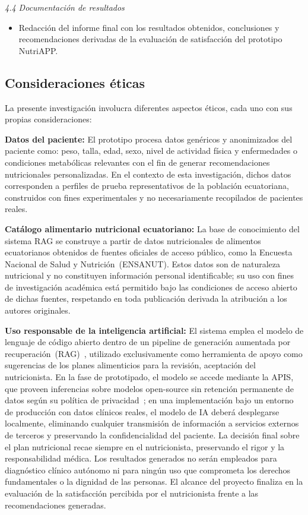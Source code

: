 \textit{4.4 Documentación de resultados}
\begin{itemize}
  \item Redacción del informe final con los resultados obtenidos, conclusiones y recomendaciones derivadas de la evaluación de satisfacción del prototipo NutriAPP.
\end{itemize}

\subsection{Consideraciones éticas}

La presente investigación involucra diferentes aspectos éticos, cada
uno con sus propias consideraciones:

\textbf{Datos del paciente:}
El prototipo procesa datos genéricos y anonimizados del paciente como: peso, talla, edad, sexo, nivel de actividad física y enfermedades o condiciones metabólicas
relevantes con el fin de generar recomendaciones nutricionales
personalizadas. En el contexto de esta investigación, dichos datos
corresponden a perfiles de prueba representativos de la población
ecuatoriana, construidos con fines experimentales y no necesariamente recopilados de pacientes reales. 

\textbf{Catálogo alimentario nutricional ecuatoriano:}
La base de conocimiento del sistema RAG se construye a partir de datos
nutricionales de alimentos ecuatorianos obtenidos de fuentes oficiales de
acceso público, como la Encuesta Nacional de Salud y Nutrición~(ENSANUT). Estos datos
son de naturaleza nutricional y no constituyen información personal
identificable; su uso con fines de investigación académica está permitido
bajo las condiciones de acceso abierto de dichas fuentes, respetando en toda
publicación derivada la atribución a los autores originales.

\textbf{Uso responsable de la inteligencia artificial:}
El sistema emplea el modelo de lenguaje de código abierto dentro de un pipeline de generación aumentada por recuperación~(RAG)~\cite{lewis2020,tokic2026},
utilizado exclusivamente como herramienta de apoyo como sugerencias de los planes alimenticios para la revisión, aceptación del nutricionista. En la fase de prototipado, el modelo se accede mediante la
APIS, que proveen inferencias sobre modelos open-source sin retención
permanente de datos según su política de privacidad~\cite{gavai2025,arshad2025};
en una implementación bajo un entorno de producción con datos clínicos reales, el modelo de IA deberá
desplegarse localmente, eliminando cualquier transmisión de información a servicios externos de terceros y
preservando la confidencialidad del paciente. La decisión final sobre el
plan nutricional recae siempre en el nutricionista, preservando el rigor y
la responsabilidad médica. Los resultados generados no serán empleados para
diagnóstico clínico autónomo ni para ningún uso que comprometa los derechos
fundamentales o la dignidad de las personas. El alcance del proyecto finaliza
en la evaluación de la satisfacción percibida por el nutricionista frente a
las recomendaciones generadas.

